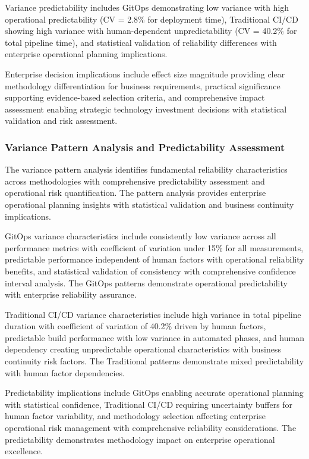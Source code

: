 Variance predictability includes GitOps demonstrating low variance with high operational predictability (CV = 2.8\% for deployment time), Traditional CI/CD showing high variance with human-dependent unpredictability (CV = 40.2\% for total pipeline time), and statistical validation of reliability differences with enterprise operational planning implications.

Enterprise decision implications include effect size magnitude providing clear methodology differentiation for business requirements, practical significance supporting evidence-based selection criteria, and comprehensive impact assessment enabling strategic technology investment decisions with statistical validation and risk assessment.

\subsubsection{Variance Pattern Analysis and Predictability Assessment}

The variance pattern analysis identifies fundamental reliability characteristics across methodologies with comprehensive predictability assessment and operational risk quantification. The pattern analysis provides enterprise operational planning insights with statistical validation and business continuity implications.

GitOps variance characteristics include consistently low variance across all performance metrics with coefficient of variation under 15\% for all measurements, predictable performance independent of human factors with operational reliability benefits, and statistical validation of consistency with comprehensive confidence interval analysis. The GitOps patterns demonstrate operational predictability with enterprise reliability assurance.

Traditional CI/CD variance characteristics include high variance in total pipeline duration with coefficient of variation of 40.2\% driven by human factors, predictable build performance with low variance in automated phases, and human dependency creating unpredictable operational characteristics with business continuity risk factors. The Traditional patterns demonstrate mixed predictability with human factor dependencies.

Predictability implications include GitOps enabling accurate operational planning with statistical confidence, Traditional CI/CD requiring uncertainty buffers for human factor variability, and methodology selection affecting enterprise operational risk management with comprehensive reliability considerations. The predictability demonstrates methodology impact on enterprise operational excellence.


